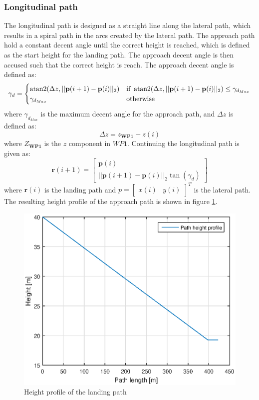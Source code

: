 \subsubsection{Longitudinal path}
The longitudinal path is designed as a straight line along the lateral path, which results in a spiral path in the arcs created by the lateral path. The approach path hold a constant decent angle until the correct height is reached, which is defined as the start height for the landing path. The approach decent angle is then accused such that the correct height is reach. The approach decent angle is defined as:
\begin{equation}
\gamma_d = \begin{cases}
\atan2(\Delta z,||\mathbf{p}(i+1)-\mathbf{p}(i)||_2) & \text{if } \atan2(\Delta z,||\mathbf{p}(i+1)-\mathbf{p}(i)||_2)\leq \gamma_{d_{Max}} \\
\gamma_{d_{Max}}										& \text{otherwise}
\end{cases}
\end{equation}
where $\gamma_{d_{Max}}$ is the maximum decent angle for the approach path, and $\Delta z$ is defined as:
\begin{equation}
\Delta z = z_{\mathbf{WP1}}-z(i)
\end{equation}
where $Z_{\mathbf{WP1}}$ is the $z$ component in $WP1$. Continuing the longitudinal path is given as:
\begin{equation}
\mathbf{r}(i+1) = \begin{bmatrix}
\mathbf{p}(i) \\
||\mathbf{p}(i+1)-\mathbf{p}(i)||_2\tan(\gamma_d)
\end{bmatrix}
\end{equation}
where $\mathbf{r}(i)$ is the landing path and 
$p = \begin{bmatrix}
x(i) & y(i)
\end{bmatrix}^T$ is the lateral path. The resulting height profile of the approach path is shown in figure \ref{Fig:HeightProfile}.
\begin{figure}[H]
	\centering
		\includegraphics[width=1\textwidth]{figs/SysPlot/heightProfile.eps}
		\caption{Height profile of the landing path}
		\label{Fig:HeightProfile}
\end{figure}
